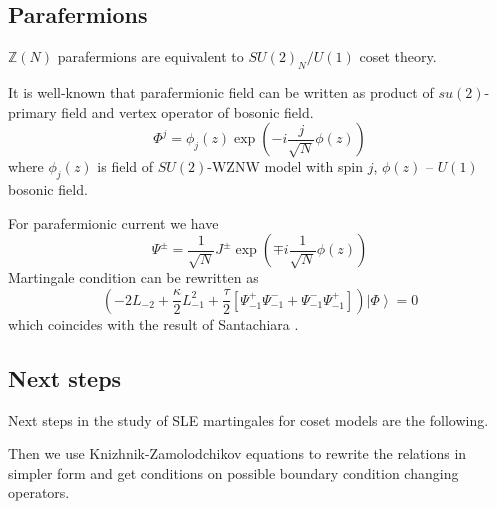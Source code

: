 \documentclass[12pt]{article}
\theoremstyle{definition}
\newcommand{\gf}{\mathfrak{g}}
\newcommand{\af}{\mathfrak{a}}
\theoremstyle{definition} \newtheorem{Def}{Definition}
\begin{document}
\subsection{Parafermions}

$\mathbb{Z}(N)$ parafermions are equivalent to $SU(2)_{N}/U(1)$ coset theory.

It is well-known that parafermionic field can be written as product of $su(2)$-primary field and vertex operator of bosonic field. 
\begin{equation*}
  \Phi^{j}=\phi_{j}(z) \exp\left( -i \frac{j}{\sqrt{N}}\phi(z)\right)
\end{equation*}
where $\phi_{j}(z)$ is field of $SU(2)$-WZNW model with spin $j$, $\phi(z)$ -- $U(1)$ bosonic field.

For parafermionic current we have
\begin{equation*}
  \Psi^{\pm}=\frac{1}{\sqrt{N}} J^{\pm}\exp\left(\mp i \frac{1}{\sqrt{N}}\phi(z)\right)
\end{equation*}
Martingale condition can be rewritten as
\begin{equation*}
  \left(-2 L_{-2}+\frac{\kappa}{2}L_{-1}^{2}+\frac{\tau}{2}\left[\Psi^{+}_{-1}\Psi^{-}_{-1}+\Psi^{-}_{-1}\Psi^{+}_{-1}\right]\right) \left|\Phi\right>=0
\end{equation*}
which coincides with the result of Santachiara \cite{santachiara2008sle}.



\subsection{Next steps}

Next steps in the study of SLE martingales for coset models  are the following. 


Then we use Knizhnik-Zamolodchikov equations to rewrite the relations in simpler form and get conditions on possible boundary condition changing operators. 
\end{document}
